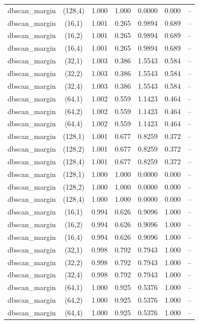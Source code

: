 \begin{tabular}{lcccccc}
dbscan\_margin & (128,4) & 1.000 & 1.000 & 0.0000 & 0.000 & -- \\
dbscan\_margin & (16,1) & 1.001 & 0.265 & 0.9894 & 0.689 & -- \\
dbscan\_margin & (16,2) & 1.001 & 0.265 & 0.9894 & 0.689 & -- \\
dbscan\_margin & (16,4) & 1.001 & 0.265 & 0.9894 & 0.689 & -- \\
dbscan\_margin & (32,1) & 1.003 & 0.386 & 1.5543 & 0.584 & -- \\
dbscan\_margin & (32,2) & 1.003 & 0.386 & 1.5543 & 0.584 & -- \\
dbscan\_margin & (32,4) & 1.003 & 0.386 & 1.5543 & 0.584 & -- \\
dbscan\_margin & (64,1) & 1.002 & 0.559 & 1.1423 & 0.464 & -- \\
dbscan\_margin & (64,2) & 1.002 & 0.559 & 1.1423 & 0.464 & -- \\
dbscan\_margin & (64,4) & 1.002 & 0.559 & 1.1423 & 0.464 & -- \\
dbscan\_margin & (128,1) & 1.001 & 0.677 & 0.8259 & 0.372 & -- \\
dbscan\_margin & (128,2) & 1.001 & 0.677 & 0.8259 & 0.372 & -- \\
dbscan\_margin & (128,4) & 1.001 & 0.677 & 0.8259 & 0.372 & -- \\
dbscan\_margin & (128,1) & 1.000 & 1.000 & 0.0000 & 0.000 & -- \\
dbscan\_margin & (128,2) & 1.000 & 1.000 & 0.0000 & 0.000 & -- \\
dbscan\_margin & (128,4) & 1.000 & 1.000 & 0.0000 & 0.000 & -- \\
dbscan\_margin & (16,1) & 0.994 & 0.626 & 0.9096 & 1.000 & -- \\
dbscan\_margin & (16,2) & 0.994 & 0.626 & 0.9096 & 1.000 & -- \\
dbscan\_margin & (16,4) & 0.994 & 0.626 & 0.9096 & 1.000 & -- \\
dbscan\_margin & (32,1) & 0.998 & 0.792 & 0.7943 & 1.000 & -- \\
dbscan\_margin & (32,2) & 0.998 & 0.792 & 0.7943 & 1.000 & -- \\
dbscan\_margin & (32,4) & 0.998 & 0.792 & 0.7943 & 1.000 & -- \\
dbscan\_margin & (64,1) & 1.000 & 0.925 & 0.5376 & 1.000 & -- \\
dbscan\_margin & (64,2) & 1.000 & 0.925 & 0.5376 & 1.000 & -- \\
dbscan\_margin & (64,4) & 1.000 & 0.925 & 0.5376 & 1.000 & -- \\

\end{tabular}
